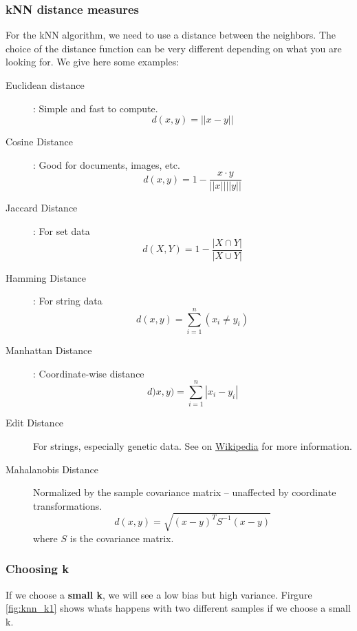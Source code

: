 \subsubsection{kNN distance measures}
For the kNN algorithm, we need to use a distance between the neighbors. The choice of the distance function can be very different depending on what you are looking for. We give here some examples:
\begin{description}
 \item[Euclidean distance]: Simple and fast to compute.
 \[
  d(x,y) = ||x-y||
 \]

 \item[Cosine Distance]: Good for documents, images, etc.
 \[
  d(x,y) = 1- \frac{x\cdot y}{||x||||y||}
 \]

 \item[Jaccard Distance]: For set data
 \[
  d(X,Y) = 1 - \frac{|X \cap Y|}{|X \cup Y|}
 \]

 \item[Hamming Distance]: For string data
 \[
  d(x,y) = \sum_{i=1}^{n} \left( x_i \neq y_i \right)
 \]
 \item[Manhattan Distance]: Coordinate-wise distance
 \[
  d)x,y) = \sum_{i=1}^n |x_i - y_i|
 \]
 \item[Edit Distance] For strings, especially genetic data. See on \href{https://en.wikipedia.org/wiki/Edit\_distance}{Wikipedia} for more information.
 \item[Mahalanobis Distance] Normalized by the sample covariance matrix -- unaffected by coordinate transformations. 
 \[
  d(x,y) = \sqrt{\left(x-y\right)^TS^{-1}\left(x-y\right)}
 \]
 where $S$ is the covariance matrix.
\end{description}

\subsubsection{Choosing k}

If we choose a {\bf small k}, we will see a low bias but high variance. Firgure \ref{fig:knn_k1} shows whats happens with two different samples if we choose a small k.

